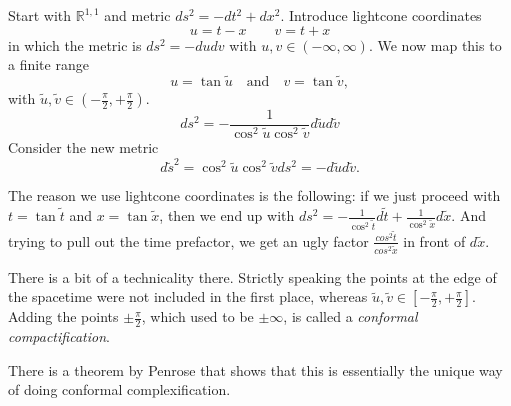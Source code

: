 Start with $\mathbb{R}^{1, 1}$ and metric $ds^2 = -dt^2 + dx^2$.
Introduce lightcone coordinates 
\begin{equation}
  u = t - x \qquad v = t + x
\end{equation}
in which the metric is $ds^2 = -du dv$ with $u, v \in (- \infty, \infty)$.
We now map this to a finite range
\begin{equation}
  u = \tan \widetilde{u} \quad \text{and} \quad v = \tan \widetilde{v}, 
\end{equation}
with $\widetilde{u}, \widetilde{v} \in (- \frac{\pi}{2}, + \frac{\pi}{2})$.
\begin{equation}
  ds^2 = - \frac{1}{\cos^2 \widetilde{u} \cos^2 \widetilde{v}} d \widetilde{u} d \widetilde{v}
\end{equation}
Consider the new metric
\begin{equation}
  d \widetilde{s}^2 = \cos ^2 \widetilde{u} \cos ^2 \widetilde{v} ds^2 = - d \widetilde{u} d \widetilde{v}.
\end{equation}
\begin{leftbar}
  \begin{note}
    The reason we use lightcone coordinates is the following: if we just proceed with $t = \tan\tilde{t}$ and $x = \tan\tilde{x}$, then we end up with $ds^2 =- \frac{1}{\cos^2 \widetilde{t}} d\tilde{t} + \frac{1}{\cos^2 \tilde{x}} d\tilde{x}$. And trying to pull out the time prefactor, we get an ugly factor $\frac{cos^2\tilde{t}}{cos^2\tilde{x}}$ in front of $d\tilde{x}$.
  \end{note}
\end{leftbar}
There is a bit of a technicality there. Strictly speaking the points at the edge of the spacetime were not included in the first place, whereas $\widetilde{u}, \widetilde{v} \in [-\frac{\pi}{2}, + \frac{\pi}{2}]$.
Adding the points $\pm \frac{\pi}{2}$, which used to be $\pm \infty$, is called a \emph{conformal compactification}.
\begin{leftbar}
  \begin{remark}
    There is a theorem by Penrose that shows that this is essentially the unique way of doing conformal complexification.
  \end{remark}
\end{leftbar}

